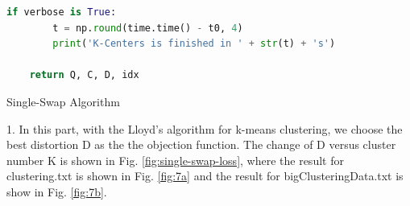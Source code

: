 \begin{description}
\begin{description}
\begin{lstlisting}[language=Python, caption=K-Centers Algorithm Python Code]
    if verbose is True:
        t = np.round(time.time() - t0, 4)
        print('K-Centers is finished in ' + str(t) + 's')

    return Q, C, D, idx
\end{lstlisting}

\end{description}

\newpage
\item[\Romannum{3}.] Single-Swap Algorithm

\begin{description}
\item{1.} In this part, with the Lloyd's algorithm for k-means clustering, we choose the best distortion D as the the objection function. The change of D versus cluster number K is shown in Fig. \ref{fig:single-swap-loss}, where the result for clustering.txt is shown in Fig. \ref{fig:7a} and the result for bigClusteringData.txt is show in Fig. \ref{fig:7b}.


\end{description}
\end{description}

